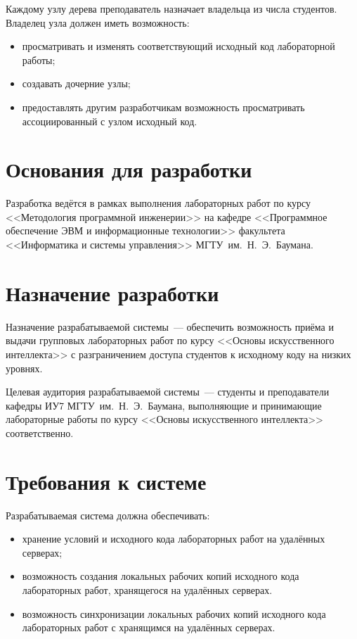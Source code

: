 \documentclass{bmstu}
\begin{document}
  Каждому узлу дерева преподаватель назначает владельца из числа
  студентов.
  Владелец узла должен иметь возможность:
  \begin{itemize}[label=---]
    \item просматривать и изменять соответствующий исходный код
      лабораторной работы;
    \item создавать дочерние узлы;
    \item предоставлять другим разработчикам возможность просматривать
      ассоциированный с узлом исходный код.
  \end{itemize}

  \section{Основания для разработки}

  Разработка ведётся в рамках выполнения лабораторных работ по курсу
  <<Методология программной инженерии>> на кафедре <<Программное
  обеспечение ЭВМ и информационные технологии>> факультета
  <<Информатика и системы управления>> МГТУ~им.~Н.~Э.~Баумана.

  \section{Назначение разработки}

  Назначение разрабатываемой системы~--- обеспечить возможность приёма
  и выдачи групповых лабораторных работ по курсу <<Основы
  искусственного интеллекта>> с разграничением доступа студентов к
  исходному коду на низких уровнях.

  Целевая аудитория разрабатываемой системы~--- студенты и
  преподаватели кафедры ИУ7 МГТУ~им.~Н.~Э.~Баумана, выполняющие и
  принимающие лабораторные работы по курсу <<Основы искусственного
  интеллекта>> соответственно.

  \section{Требования к системе}

  Разрабатываемая система должна обеспечивать:
  \begin{itemize}[label=---]
    \item хранение условий и исходного кода лабораторных работ на
      удалённых серверах;
    \item возможность создания локальных рабочих копий исходного кода
      лабораторных работ, хранящегося на удалённых серверах.
    \item возможность синхронизации локальных рабочих копий исходного
      кода лабораторных работ с хранящимся на удалённых серверах.
  \end{itemize}
\end{document}
